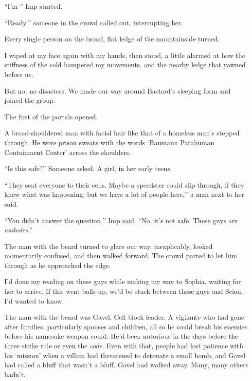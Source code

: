 ``I'm-'' Imp started.



``Ready,'' someone in the crowd called out, interrupting her.



Every single person on the broad, flat ledge of the mountainside turned.



I wiped at my face again with my hands, then stood, a little alarmed at how the stiffness of the cold hampered my movements, and the nearby ledge that yawned before us.



But no, no disasters.  We made our way around Bastard's sleeping form and joined the group.



The first of the portals opened.



A broad-shouldered man with facial hair like that of a homeless man's stepped through.  He wore prison sweats with the words `Baumann Parahuman Containment Center' across the shoulders.



``Is this safe?''  Someone asked.  A girl, in her early teens.



``They sent everyone to their cells.  Maybe a speedster could slip through, if they knew what was happening, but we have a lot of people here,'' a man next to her said.



``You didn't answer the question,'' Imp said.  ``No, it's not safe.  These guys are \emph{assholes}.''



The man with the beard turned to glare our way, inexplicably, looked momentarily confused, and then walked forward.  The crowd parted to let him through as he approached the edge.



I'd done my reading on these guys while making my way to Sophia, waiting for her to arrive.  If this went balls-up, we'd be stuck between these guys and Scion.  I'd wanted to know.



The man with the beard was Gavel.  Cell block leader.  A vigilante who had gone after families, particularly spouses and children, all so he could break his enemies before his namesake weapon could.  He'd been notorious in the days before the three strike rule or even the \emph{code}.  Even with that, people had lost patience with his `mission' when a villain had threatened to detonate a small bomb, and Gavel had called a bluff that wasn't a bluff.  Gavel had walked away.  Many, many others hadn't.



